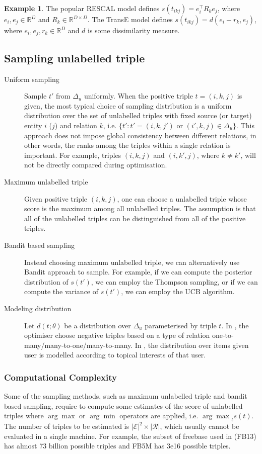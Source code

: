 \documentclass{article}
\theoremstyle{definition}
\newtheorem{example}{Example}[definition]
\begin{document}
\begin{example}
The popular RESCAL model defines $s(t_{ikj}) = e_i^\top R_k e_j$, where $e_i, e_j \in \mathbb{R}^{D}$ and $R_k \in \mathbb{R}^{D\times D}$. The TransE model defines $s(t_{ikj}) = d(e_i - r_k, e_j)$, where $e_i, e_j, r_k \in \mathbb{R}^{D}$ and $d$ is some dissimilarity measure. 
\end{example}

\subsection{Sampling unlabelled triple}
\begin{description}
\item[Uniform sampling] Sample $t'$ from $\Delta_u$ uniformly. When the positive triple $t = (i,k,j)$ is given, the most typical choice of sampling distribution is a uniform distribution over the set of unlabelled triples with fixed source (or target) entity $i$ ($j$) and relation $k$, i.e. $\{t':t'=(i,k,j') \text{ or } (i',k,j) \in \Delta_u\}$. This approach does not impose global consistency between different relations, in other words, the ranks among the triples within a single relation is important. For example, triples $(i,k,j)$ and $(i,k',j)$, where $k \neq k'$, will not be directly compared during optimisation.
\item[Maximum unlabelled triple] Given positive triple $(i,k,j)$, one can choose a unlabelled triple whose score is the maximum among all unlabelled triples. The assumption is that all of the unlabelled triples can be distinguished from all of the positive triples. 
\item[Bandit based sampling] Instead choosing maximum unlabelled triple, we can alternatively use Bandit approach to sample. For example, if we can compute the posterior distribution of $s(t')$, we can employ the Thompson sampling, or if we can compute the variance of $s(t')$, we can employ the UCB algorithm.
\item[Modeling distribution] Let $d(t;\theta)$ be a distribution over $\Delta_u$ parameterised by triple $t$. In \cite{Wang2014}, the optimiser choose negative triples based on a type of relation one-to-many/many-to-one/many-to-many. In \cite{Liang2015}, the distribution over items given user is modelled according to topical interests of that user. 
\end{description}

\subsubsection{Computational Complexity}
Some of the sampling methods, such as maximum unlabelled triple and bandit based sampling, require to compute some estimates of the score of unlabelled triples where $\arg\max$ or $\arg\min$ operators are applied, i.e. ${\arg\max}_{t}s(t)$. The number of triples to be estimated is $|\mathcal{E}|^2\times|\mathcal{R}|$, which usually cannot be evaluated in a single machine. For example, the subset of freebase used in \cite{gu2015traversing} (FB13) has almost 73 billion possible triples and FB5M has 3e16 possible triples.
\end{document}
